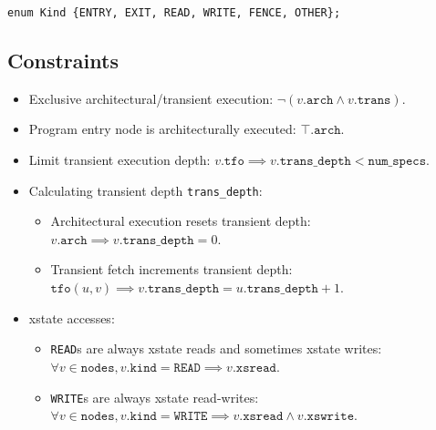 \documentclass{article}
\newcommand{\kind}{\texttt{kind}}
\newcommand{\READ}{\texttt{READ}}
\newcommand{\WRITE}{\texttt{WRITE}}
\newcommand{\tfo}{\texttt{tfo}}
\newcommand{\nodes}{\texttt{nodes}}
\newcommand{\arch}{\texttt{arch}}
\newcommand{\trans}{\texttt{trans}}
\newcommand{\transdepth}{\texttt{trans\_depth}}
\newcommand{\xsread}{\texttt{xsread}}
\newcommand{\xswrite}{\texttt{xswrite}}
\newcommand{\numspecs}{\texttt{num\_specs}}
\begin{document}
\begin{verbatim}
enum Kind {ENTRY, EXIT, READ, WRITE, FENCE, OTHER};
\end{verbatim}

\subsection{Constraints}
\begin{itemize}
\item Exclusive architectural/transient execution: $\neg \left( v.\arch \wedge v.\trans \right)$.
\item Program entry node is architecturally executed: $\top.\arch$.
\item Limit transient execution depth: $v.\tfo \implies v.\transdepth < \numspecs$.
\item Calculating transient depth \transdepth:
  \begin{itemize}
  \item Architectural execution resets transient depth:
    $v.\arch \implies v.\transdepth = 0$.
  \item Transient fetch increments transient depth:
    $\tfo(u,v) \implies v.\transdepth = u.\transdepth + 1$.
  \end{itemize}
\item xstate accesses:
  \begin{itemize}
  \item \READ{}s are always xstate reads and sometimes xstate writes:
    $\forall v \in \nodes, v.\kind = \READ \implies v.\xsread$.
  \item \WRITE{}s are always xstate read-writes:
    $\forall v \in \nodes, v.\kind = \WRITE \implies v.\xsread \wedge v.\xswrite$.
  \end{itemize}
\end{itemize}
\end{document}
